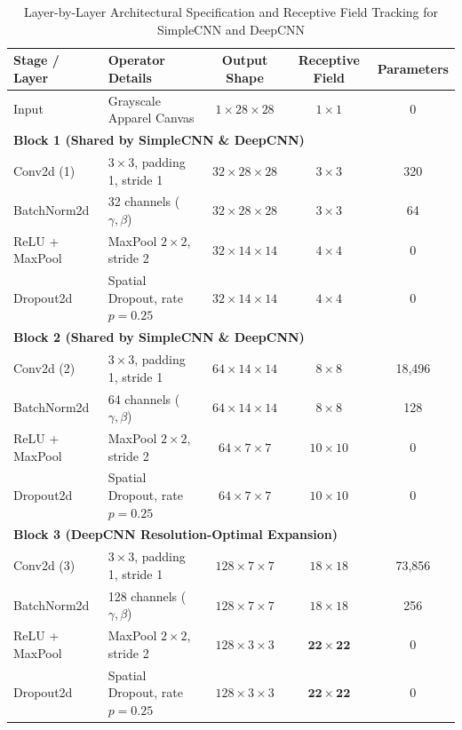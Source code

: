 \documentclass[conference]{IEEEtran}
\begin{document}
\begin{table}[t]
\centering
\caption{Layer-by-Layer Architectural Specification and Receptive Field Tracking for SimpleCNN and DeepCNN}
\label{tab:receptive_field}
\small
\setlength{\tabcolsep}{6pt}
\begin{tabular*}{\textwidth}{@{\extracolsep{\fill}}llccc@{}}
\toprule
\textbf{Stage / Layer} & \textbf{Operator Details} & \textbf{Output Shape} & \textbf{Receptive Field} & \textbf{Parameters} \\
\midrule
Input        & Grayscale Apparel Canvas  & $1 \times 28 \times 28$   & $1 \times 1$   & 0 \\
\midrule
\multicolumn{5}{l}{\textbf{Block 1 (Shared by SimpleCNN \& DeepCNN)}} \\
Conv2d (1)   & $3\times3$, padding 1, stride 1 & $32 \times 28 \times 28$  & $3 \times 3$   & 320 \\
BatchNorm2d  & 32 channels ($\gamma, \beta$)& $32 \times 28 \times 28$ & $3 \times 3$   & 64 \\
ReLU + MaxPool & MaxPool $2\times2$, stride 2& $32 \times 14 \times 14$  & $4 \times 4$   & 0 \\
Dropout2d    & Spatial Dropout, rate $p=0.25$& $32 \times 14 \times 14$  & $4 \times 4$   & 0 \\
\midrule
\multicolumn{5}{l}{\textbf{Block 2 (Shared by SimpleCNN \& DeepCNN)}} \\
Conv2d (2)   & $3\times3$, padding 1, stride 1 & $64 \times 14 \times 14$  & $8 \times 8$   & 18,496 \\
BatchNorm2d  & 64 channels ($\gamma, \beta$)& $64 \times 14 \times 14$ & $8 \times 8$   & 128 \\
ReLU + MaxPool & MaxPool $2\times2$, stride 2& $64 \times 7 \times 7$    & $10 \times 10$ & 0 \\
Dropout2d    & Spatial Dropout, rate $p=0.25$& $64 \times 7 \times 7$    & $10 \times 10$ & 0 \\
\midrule
\multicolumn{5}{l}{\textbf{Block 3 (DeepCNN Resolution-Optimal Expansion)}} \\
Conv2d (3)   & $3\times3$, padding 1, stride 1 & $128 \times 7 \times 7$   & $18 \times 18$ & 73,856 \\
BatchNorm2d  & 128 channels ($\gamma, \beta$)& $128 \times 7 \times 7$& $18 \times 18$ & 256 \\
ReLU + MaxPool & MaxPool $2\times2$, stride 2& $128 \times 3 \times 3$   & $\mathbf{22 \times 22}$ & 0 \\
Dropout2d    & Spatial Dropout, rate $p=0.25$& $128 \times 3 \times 3$   & $\mathbf{22 \times 22}$ & 0 \\

\end{tabular*}
\end{table}
\end{document}
